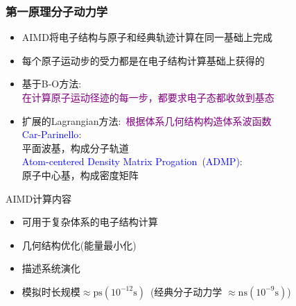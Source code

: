 \frame
{
	\frametitle{第一原理分子动力学}
	\begin{itemize}
		\item \textrm{AIMD}将电子结构与原子和经典轨迹计算在同一基础上完成
		\item 每个原子运动步的受力都是在电子结构计算基础上获得的
		\item 基于\textrm{B-O}方法:\\\textcolor{purple}{在计算原子运动径迹的每一步，都要求电子态都收敛到基态}
		\item 扩展的\textrm{Lagrangian}方法:~\textcolor{purple}{根据体系几何结构构造体系波函数}\\
			\textcolor{blue}{\textrm{Car-Parinello}}:\\
			平面波基，构成分子轨道\\
			\textcolor{blue}{\textrm{Atom-centered Density Matrix Progation~(ADMP)}}:\\
			原子中心基，构成密度矩阵
	\end{itemize}
	\textrm{AIMD}计算内容
	\begin{itemize}
		\item 可用于复杂体系的电子结构计算
		\item 几何结构优化(能量最小化)
		\item 描述系统演化
		\item 模拟时长规模$\approx{\mathrm{ps}}(10^{-12}\mathrm{s})$~(经典分子动力学 $\approx\mathrm{ns}(10^{-9}\mathrm{s})$)
	\end{itemize}
}


%
